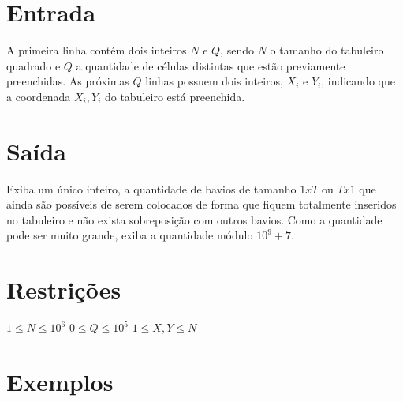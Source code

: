 \section*{Entrada}

A primeira linha contém dois inteiros $N$ e $Q$, sendo $N$ o tamanho do tabuleiro quadrado e $Q$ a quantidade de células distintas que estão previamente preenchidas.
As próximas $Q$ linhas possuem dois inteiros, $X_i$ e $Y_i$, indicando que a coordenada $X_i, Y_i$ do tabuleiro está preenchida.

\section*{Saída}

Exiba um único inteiro, a quantidade de bavios de tamanho $1xT$ ou $Tx1$ que ainda são possíveis de serem colocados de forma que fiquem totalmente inseridos no tabuleiro e não exista sobreposição com outros bavios. Como a quantidade pode ser muito grande, exiba a quantidade módulo $10^9+7$.

\section*{Restrições}

$1 \leq N \leq 10^6$
$0 \leq Q \leq 10^5$
$1 \leq X, Y \leq N$

\section*{Exemplos}
\exemplo